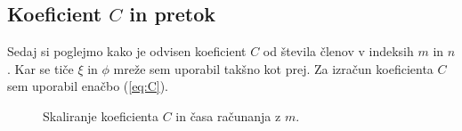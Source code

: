 \documentclass[a4paper]{article}
\begin{document}
\subsection{Koeficient $C$ in pretok}
Sedaj si poglejmo kako je odvisen koeficient $C$ od števila členov v indeksih $m$ in $n$. Kar se tiče $\xi$ in $\phi$ mreže
sem uporabil takšno kot prej. Za izračun koeficienta $C$ sem uporabil enačbo (\ref{eq:C}). 
\begin{figure}[H]
    \centering
    \caption{Skaliranje koeficienta $C$ in časa računanja z $m$.}
\end{figure}
\end{document}

